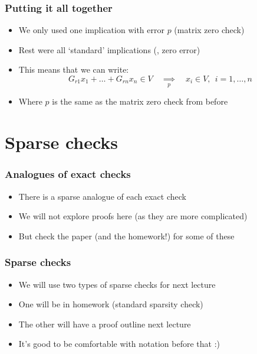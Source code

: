 \documentclass{beamer}
\newcommand{\impliesn}[1]{\underset{#1}{\implies}}
\newcommand{\impliesp}{\impliesn{p}}
\begin{document}
    \begin{frame}
        \frametitle{Putting it all together}
        \begin{itemize}\itemsep=12pt
            \item We only used one implication with error $p$ (matrix zero check)
            \item Rest were all `standard' implications (\ie, zero error)
            \item This means that we can write:
            \[
                G_{r1}x_1 + \dots + G_{rn} x_n \in V \quad\impliesp\quad x_i \in V,~~i=1,\dots,n
            \]
            \item Where $p$ is the same as the matrix zero check from before
        \end{itemize}
    \end{frame}
    \section{Sparse checks}
    \begin{frame}
        \frametitle{Analogues of exact checks}
        \begin{itemize}\itemsep=12pt
            \item There is a sparse analogue of each exact check
            \item We will not explore proofs here (as they are more complicated)
            \item But check the paper (and the homework!) for some of these
        \end{itemize}
    \end{frame}

    \begin{frame}
        \frametitle{Sparse checks}
        \begin{itemize}\itemsep=12pt
            \item We will use two types of sparse checks for next lecture
            \item One will be in homework (standard sparsity check)
            \item The other will have a proof outline next lecture
            \pause
            \item It's good to be comfortable with notation before that :)
        \end{itemize}
    \end{frame}
\end{document}
